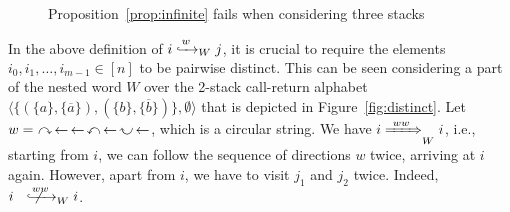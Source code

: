 \documentclass{LMCS}
\begin{document}
\begin{figure}[h]
\begin{center}
\caption{Proposition~\ref{prop:infinite} fails when considering three
  stacks\label{fig:threestacks}}
\end{center}
\end{figure}
In the above definition of $\Wleadsto{W}{w}{i}{j}$, it is crucial to require
the elements $i_0,i_1,\ldots,i_{m-1} \in [n]$ to be pairwise distinct. This
can be seen considering a part of the nested word $W$ over the 2-stack
call-return alphabet $\langle
\{(\{a\},\{\overline{a}\}),(\{b\},\{\overline{b}\})\},\emptyset \rangle$ that
is depicted in Figure~\ref{fig:distinct}. Let $w=~\rightone ~\! \leftarrow ~\!
\leftarrow ~\! \leftone ~\! \leftarrow ~\! \lefttwo ~\! \leftarrow$, which is
a circular string. We have $\Wleadstoeq{W}{ww}{i}{i}$, i.e., starting from
$i$, we can follow the sequence of directions $w$ twice, arriving at $i$
again. However, apart from $i$, we have to visit $j_1$ and $j_2$ twice.
Indeed,
$i~\! \mathrel{{~~~\not\!\!\!\xhookrightarrow{ww~}}_{W}} i$.
\end{document}
